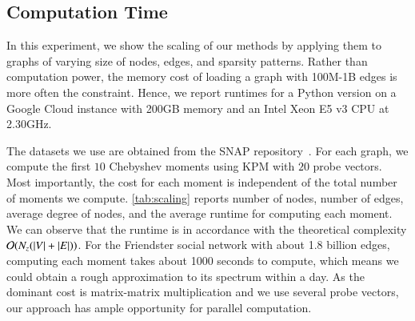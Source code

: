 \subsection{Computation Time}

In this experiment, we show the scaling of our methods by applying them to
graphs of varying size of nodes, edges, and sparsity patterns. Rather than
computation power, the memory cost of loading a graph with 100M-1B edges is more
often the constraint. Hence, we report runtimes for a Python version on a Google
Cloud instance with 200GB memory and an Intel Xeon E5 v3 CPU at 2.30GHz.

The datasets we use are obtained from the SNAP repository~\cite{snapnets}. For
each graph, we compute the first $10$ Chebyshev moments using KPM with $20$
probe vectors. Most importantly, the cost for each moment is independent of the
total number of moments we compute. \cref{tab:scaling} reports number of
nodes, number of edges, average degree of nodes, and the average runtime for
computing each moment. We can observe that the runtime is in accordance with
the theoretical complexity $\mathcal{O}(N_z(\left\lvert V\right\rvert + \left\lvert E\right\rvert))$. For the Friendster
social network with about 1.8 billion edges, computing each moment takes about
1000 seconds to compute, which means we could obtain a rough approximation to
its spectrum within a day. As the dominant cost is matrix-matrix multiplication
and we use several probe vectors, our approach has ample opportunity for
parallel computation.
